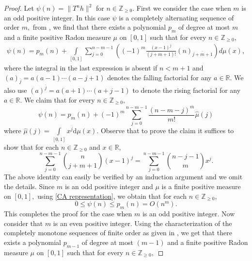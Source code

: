 \documentclass[10pt,oneside,reqno]{amsart}
\theoremstyle{definition}
\theoremstyle{remark}
\renewcommand{\le}{\leqslant}
\renewcommand{\ge}{\geqslant}
\numberwithin{equation}{section}
\begin{document}
\begin{proof}
 Let $\psi(n)= \|T^nh\|^2$ for $n\in \mathbb Z_{\geqslant 0}.$ First we consider the case when $m$ is an odd positive integer. In this case $\psi$ is a completely alternating sequence of order $m,$ from \cite[Theorem 2.5]{CS17}, we find that there exists a polynomial $p_m$ of degree at most $m$ and a finite positive Radon measure $\mu$ on $[0,1]$ such that for every $n\in \mathbb Z_{\geqslant 0},$
 \begin{align*}
   \psi(n) = p_{m}(n) + \int\limits_{[0,1]}\sum_{j=0}^{n-m-1}\left((-1)^{m}\frac{(x-1)^{j}}{(j+m+1)!}(n)_{\overline{j+m+1}}\right)d\mu(x),
\end{align*}
    where the integral in the last expression is absent if $n < m+1$ and $(a)_{\overline{j}}=a(a-1)\cdots(a-j+1)$ denotes the falling factorial for any $a\in \mathbb R$. We also use $(a)^{\overline{j}}=a(a+1)\cdots(a+j-1)$ to denote the rising factorial for any $a\in \mathbb R.$ We claim that for every $n\in  \mathbb Z_{\geqslant 0},$
    \begin{equation}\label{CA representation}
	\psi \left( n \right) = p_{m} \left( n \right) + \left( -1 \right)^{m} \sum_{j=0}^{n-m-1} \frac{\left( n-m-j \right)^{\overline{m}}}{m!} \hat{\mu} \left( j \right)
    \end{equation}
    where 
    $\hat{\mu} \left( j \right) = \int\limits_{[0,1]} x^{j} \mathrm{d}\mu \left( x \right)$.
    Observe that to prove the claim it suffices to show that for each $n \in \mathbb{Z}_{\ge 0}$ and $x \in \mathbb R$,
    \begin{equation}\label{magic identity}
	\sum_{j=0}^{n-m-1} \binom{n}{j+m+1} \left( x-1 \right)^{j} = 
	\sum_{j=0}^{n-m-1} \binom{n-j-1}{m} x^{j}.
    \end{equation}
The above identity can easily be verified by an induction argument and we omit the details.  Since $m$ is an odd positive integer and $\mu$ is a finite positive measure on $[0,1],$ using \eqref{CA representation}, we obtain that for each $n \in \mathbb Z_{\geqslant 0},$ 
    \begin{equation*}
	0 \leqslant \psi \left( n \right) \le p_{m} \left( n \right) = O \left( n^{m} \right).
    \end{equation*}  This completes the proof for the case when $m$ is an odd positive integer. Now consider that $m$ is an even positive integer. Using the characterization of the completely monotone sequences of finite order as given in \cite[Theorem 3.6]{CMF}, we get that there exists a polynomial $p_{m-1}$ of degree at most $(m-1)$ and a finite positive Radon measure $\mu$ on $[0,1]$ such that for every $n\in \mathbb Z_{\geqslant 0},$

\end{proof}
\end{document}
